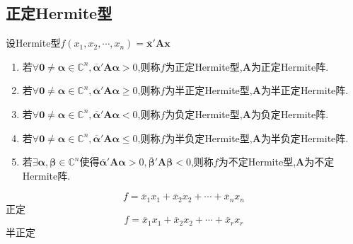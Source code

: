 \subsection{正定Hermite型}
\begin{formal}
    \begin{definition}[正定Hermite型的定义]\label{def:正定Hermite型的定义}
        设\textup{Hermite}型$f\left(x_1,x_2,\cdots,x_n\right)=\overline{\bm{x}}'\bm{Ax}$\begin{enumerate}[label={\textup{(\arabic*)}}]
            \item 若$\forall \bm{0}\neq\bm{\alpha}\in\mathbb{C}^n,\overline{\bm{\alpha}}'\bm{A\alpha}>0$,则称$f$为正定\textup{Hermite}型,$\bm{A}$为正定\textup{Hermite}阵.
            \item 若$\forall \bm{0}\neq\bm{\alpha}\in\mathbb{C}^n,\overline{\bm{\alpha}}'\bm{A\alpha}\geqslant 0$,则称$f$为半正定\textup{Hermite}型,$\bm{A}$为半正定\textup{Hermite}阵.
            \item 若$\forall \bm{0}\neq\bm{\alpha}\in\mathbb{C}^n,\overline{\bm{\alpha}}'\bm{A\alpha}<0$,则称$f$为负定\textup{Hermite}型,$\bm{A}$为负定\textup{Hermite}阵.
            \item 若$\forall \bm{0}\neq\bm{\alpha}\in\mathbb{C}^n,\overline{\bm{\alpha}}'\bm{A\alpha}\leqslant 0$,则称$f$为半负定\textup{Hermite}型,$\bm{A}$为半负定\textup{Hermite}阵.
            \item 若$\exists \bm{\alpha},\bm{\beta}\in\mathbb{C}^n$使得$\overline{\bm{\alpha}}'\bm{A\alpha}>0,\overline{\bm{\beta}}'\bm{A\beta}<0$,则称$f$为不定\textup{Hermite}型,$\bm{A}$为不定\textup{Hermite}阵.
        \end{enumerate}
    \end{definition}
\end{formal}
\begin{brown}
    \begin{example}
        \[
        f=\overline{x}_1x_1+\overline{x}_2x_2+\cdots+\overline{x}_nx_n
        \]正定\[
        f=\overline{x}_1x_1+\overline{x}_2x_2+\cdots+\overline{x}_rx_r
        \]半正定
    \end{example}
\end{brown}
